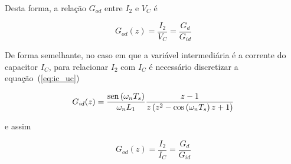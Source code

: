     Desta forma, a relação $G_{od}$ entre $I_2$ e $V_C$ é

    \begin{equation}
        G_{od}(z) = \frac{I_2}{V_C} = \frac{G_d}{G_{id}}
    \end{equation}

    De forma semelhante, no caso em que a variável intermediária é a corrente do
    capacitor $I_C$, para relacionar $I_2$ com $I_C$ é necessário discretizar a
    equação~(\ref{eq:ic_uc})

    \begin{equation}
        G_{id}(z) = \frac{\operatorname{sen} \left( \omega_n T_s \right)}{\omega_n L_1}
            \frac{z-1}{z \left( z^2 - \cos \left( \omega_n T_s \right) z + 1 \right)}
    \end{equation}

    e assim

    \begin{equation}
        G_{od}(z) = \frac{I_2}{I_C} = \frac{G_d}{G_{id}}
    \end{equation}


